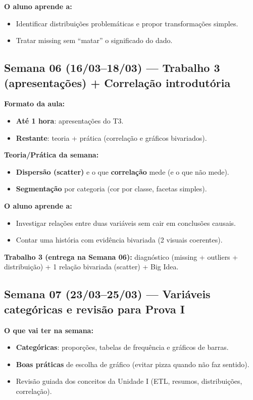 \textbf{O aluno aprende a:}
\begin{itemize}[leftmargin=*]
  \item Identificar distribuições problemáticas e propor transformações simples.
  \item Tratar missing sem ``matar'' o significado do dado.
\end{itemize}

\subsection*{Semana 06 (16/03--18/03) --- Trabalho 3 (apresentações) + Correlação introdutória}
\textbf{Formato da aula:}
\begin{itemize}[leftmargin=*]
  \item \textbf{Até 1 hora}: apresentações do T3.
  \item \textbf{Restante}: teoria + prática (correlação e gráficos bivariados).
\end{itemize}

\textbf{Teoria/Prática da semana:}
\begin{itemize}[leftmargin=*]
  \item \textbf{Dispersão (scatter)} e o que \textbf{correlação} mede (e o que não mede).
  \item \textbf{Segmentação} por categoria (cor por classe, facetas simples).
\end{itemize}

\textbf{O aluno aprende a:}
\begin{itemize}[leftmargin=*]
  \item Investigar relações entre duas variáveis sem cair em conclusões causais.
  \item Contar uma história com evidência bivariada (2 visuais coerentes).
\end{itemize}

\begin{SolvedBox}
\textbf{Trabalho 3 (entrega na Semana 06):} diagnóstico (missing + outliers + distribuição) + 1 relação bivariada (scatter) + Big Idea.
\end{SolvedBox}

\subsection*{Semana 07 (23/03--25/03) --- Variáveis categóricas e revisão para Prova I}
\textbf{O que vai ter na semana:}
\begin{itemize}[leftmargin=*]
  \item \textbf{Categóricas}: proporções, tabelas de frequência e gráficos de barras.
  \item \textbf{Boas práticas} de escolha de gráfico (evitar pizza quando não faz sentido).
  \item Revisão guiada dos conceitos da Unidade I (ETL, resumos, distribuições, correlação).
\end{itemize}

